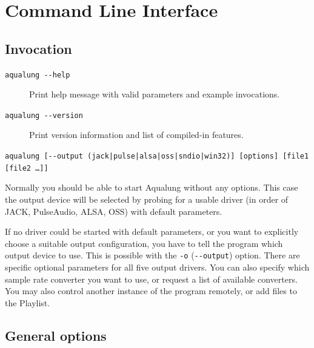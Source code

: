 \documentclass[10pt,english]{article}
\begin{document}
\section{Command Line Interface\label{idp347968}}

\subsection{Invocation\label{idp348496}}

\begin{description}

\item [
\texttt{aqualung {-}{-}help}
]

Print help message with valid parameters and
example invocations.

\item [
\texttt{aqualung {-}{-}version}
]

Print version information and list of
compiled-in features.

\item [
\texttt{aqualung [{-}{-}output (jack|pulse|alsa|oss|sndio|win32)] [options] [file1 [file2 \dots{}]]}
]

\end{description}



\noindent Normally you should be able to start Aqualung
without any options. This case the output device will be
selected by probing for a usable driver (in order of JACK,
PulseAudio, ALSA, OSS) with default parameters.




If no driver could be started with default
parameters, or you want to explicitly choose a suitable output
configuration, you have to tell the program which output
device to use. This is possible with the \texttt{-o}
(\texttt{{-}{-}output}) option. There are specific optional
parameters for all five output drivers. You can also specify
which sample rate converter you want to use, or request a list
of available converters. You may also control another instance
of the program remotely, or add files to the Playlist.




\subsection{General options\label{idp356752}}
\end{document}
